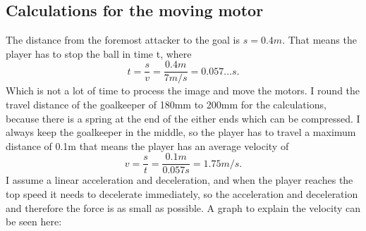 \subsection{Calculations for the moving motor}\label{subsec:moving_motor}
The distance from the foremost attacker to the goal is $s=0.4m$.
That means the player has to stop the ball in time t, where
\begin{equation}
    \label{eq:stopping_time}
    t = \frac{s}{v} = \frac{0.4m}{7m/s} = 0.057\dots s.
\end{equation}
Which is not a lot of time to process the image and move the motors.
I round the travel distance of the goalkeeper of 180mm to 200mm for the calculations, because there is a spring at the end of the either ends which can be compressed.
I always keep the goalkeeper in the middle, so the player has to travel a maximum distance of 0.1m that means the player has an average velocity of
\begin{equation}
    \label{eq:average_velocity}
    v = \frac{s}{t} = \frac{0.1m}{0.057s} = 1.75m/s.
\end{equation}
I assume a linear acceleration and deceleration, and when the player reaches the top speed it needs to decelerate immediately, so the acceleration and deceleration and therefore the force is as small as possible.
A graph to explain the velocity can be seen here:

\begin{center}
\end{center}

